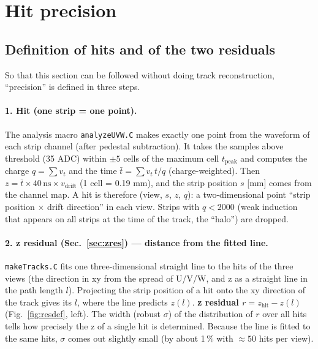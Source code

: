 \documentclass[a4paper,11pt]{article}
\begin{document}
\section{Hit precision}

\subsection{Definition of hits and of the two residuals}\label{sec:residual-def}
So that this section can be followed without doing track reconstruction, ``precision'' is defined in three steps.

\paragraph{1. Hit (one strip = one point).}
The analysis macro \texttt{analyzeUVW.C} makes exactly one point from the waveform of each strip channel (after pedestal subtraction).
It takes the samples above threshold (35 ADC) within $\pm 5$ cells of the maximum cell $t_\mathrm{peak}$ and computes
the charge $q = \sum v_t$ and the time $\bar t = \sum v_t\, t / q$ (charge-weighted).
Then $z = \bar t \times 40\,\mathrm{ns} \times v_\mathrm{drift}$ (1 cell = 0.19 mm), and the strip position $s$ [mm] comes from the channel map.
A hit is therefore (view, $s$, $z$, $q$): a two-dimensional point ``strip position $\times$ drift direction'' in each view.
Strips with $q < 2000$ (weak induction that appears on all strips at the time of the track, the ``halo'') are dropped.

\paragraph{2. z residual (Sec.~\ref{sec:zres}) --- distance from the fitted line.}
\texttt{makeTracks.C} fits one three-dimensional straight line to the hits of the three views (the direction in xy from the spread of U/V/W,
and z as a straight line in the path length $l$). Projecting the strip position of a hit onto the xy direction of the track gives its $l$,
where the line predicts $z(l)$. \textbf{z residual $r = z_\mathrm{hit} - z(l)$} (Fig.~\ref{fig:resdef}, left).
The width (robust $\sigma$) of the distribution of $r$ over all hits tells how precisely the z of a single hit is determined.
Because the line is fitted to the same hits, $\sigma$ comes out slightly small (by about 1\,\% with $\approx 50$ hits per view).
\end{document}
